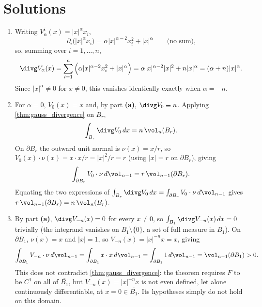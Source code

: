 
\section{Solutions}
\label{sec:flux_solutions}

\begin{exercisesolution}
\label{sol:radial_vector_fields_flux}
\begin{enumerate}[label=\textbf{(\alph*)}]
  \item Writing $V_\alpha^i(x) = \lvert x\rvert^\alpha x_i$,
    \[
    \partial_i\big(\lvert x\rvert^\alpha x_i\big) = \alpha\lvert x\rvert^{\alpha-2}x_i^2
      + \lvert x\rvert^\alpha \qquad \text{(no sum),}
    \]
    so, summing over $i=1,\ldots,n$,
    \[
    \divg V_\alpha(x) = \sum_{i=1}^n \Big(\alpha\lvert x\rvert^{\alpha-2}x_i^2 + \lvert
      x\rvert^\alpha\Big) = \alpha\lvert x\rvert^{\alpha-2}\lvert x\rvert^2
      + n\lvert x\rvert^\alpha = (\alpha+n)\lvert x\rvert^\alpha.
    \]
    Since $\lvert x\rvert^\alpha \neq 0$ for $x\neq0$, this vanishes identically exactly when
    $\alpha = -n$.
  \item For $\alpha=0$, $V_0(x)=x$ and, by part \textbf{(a)}, $\divg V_0 \equiv n$. Applying
    \cref{thm:gauss_divergence} on $B_r$,
    \[\int_{B_r} \divg V_0\,dx = n\,\vol_n(B_r).\]
    On $\partial B_r$ the outward unit normal is $\nu(x) = x/r$, so $V_0(x)\cdot\nu(x) = x\cdot
    x/r = \lvert x\rvert^2/r = r$ (using $\lvert x\rvert=r$ on $\partial B_r$), giving
    \[\int_{\partial B_r} V_0\cdot\nu\,d\vol_{n-1} = r\,\vol_{n-1}(\partial B_r).\]
    Equating the two expressions of $\int_{B_r}\divg V_0\,dx = \int_{\partial B_r}V_0\cdot\nu\,
    d\vol_{n-1}$ gives $r\,\vol_{n-1}(\partial B_r) = n\,\vol_n(B_r)$.
  \item By part \textbf{(a)}, $\divg V_{-n}(x) = 0$ for every $x\neq0$, so $\int_{B_1}\divg
    V_{-n}(x)\,dx = 0$ trivially (the integrand vanishes on $B_1\setminus\{0\}$, a set of full
    measure in $B_1$). On $\partial B_1$, $\nu(x)=x$ and $\lvert x\rvert=1$, so $V_{-n}(x) =
    \lvert x\rvert^{-n}x = x$, giving
    \[\int_{\partial B_1} V_{-n}\cdot\nu\,d\vol_{n-1} = \int_{\partial B_1} x\cdot x\,d\vol_{n-1}
      = \int_{\partial B_1} 1\,d\vol_{n-1} = \vol_{n-1}(\partial B_1) > 0.\]
    This does not contradict \cref{thm:gauss_divergence}: the theorem requires $F$ to be $C^1$ on
    all of $\overline{B_1}$, but $V_{-n}(x) = \lvert x\rvert^{-n}x$ is not even defined, let
    alone continuously differentiable, at $x=0 \in \overline{B_1}$. Its hypotheses simply do not
    hold on this domain.
\end{enumerate}
\end{exercisesolution}

